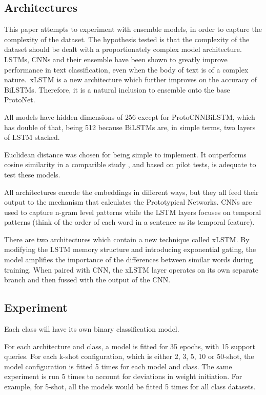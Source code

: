 \documentclass[11pt]{article}
\begin{document}
\subsection{Architectures}
This paper attempts to experiment with ensemble models, in order to capture the complexity of the dataset. The hypothesis tested is that the complexity of the dataset should be dealt with a proportionately complex model architecture.
LSTMs\cite{JAMSHIDI2024102306,liu2024optimizingnewstextclassification,Sachan_2019}, CNNs\cite{kim2014convolutionalneuralnetworkssentence} and their ensemble\cite{zhou2015clstmneuralnetworktext,KAUR2023108699,app14146282} have been shown to greatly improve performance in text classification, even when the body of text is of a complex nature\cite{liu2024optimizingnewstextclassification,app14146282}.\ xLSTM is a new architecture which further improves on the accuracy of BiLSTMs\cite{beck2024xlstmextendedlongshortterm}. Therefore, it is a natural inclusion to ensemble onto the base ProtoNet.

All models have hidden dimensions of 256 except for ProtoCNNBiLSTM, 
which has double of that, being 512
because BiLSTMs are, in simple terms, two layers of LSTM stacked.

Euclidean distance was chosen for being simple to implement. It outperforms cosine similarity in a comparible study \cite{NIPS2017_cb8da676}, and based on pilot tests, is adequate to test these models.

All architectures encode the embeddings in different ways, but they all feed their output to the mechanism that calculates the Prototypical Networks.
CNNs are used to capture n-gram level patterns while the LSTM layers focuses on temporal patterns (think of the order of each word in a sentence as its temporal feature).

There are two architectures which contain a new technique called xLSTM\cite{beck2024xlstmextendedlongshortterm}. By modifying the LSTM memory structure and introducing exponential gating, the model amplifies the importance of the differences between similar words during training.
When paired with CNN, the xLSTM layer operates on its own separate branch and then fussed with the output of the CNN.

\subsection{Experiment}
Each class 
will have its own binary classification model.

For each architecture and class, a model is fitted for 35 epochs, with 15 support queries. For each k-shot configuration, which is either 2, 3, 5, 10 or 50-shot, the model configuration is fitted 5 times for each model and class. The same experiment is run 5 times to account for deviations in weight initiation.
For example, for 5-shot, all the models would be fitted 5 times for all class datasets.
\end{document}
